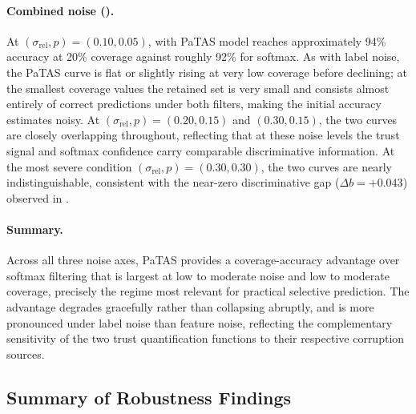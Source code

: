 \paragraph{Combined noise ().}
 At $(\sigma_{\text{rel}}, p) = (0.10, 0.05)$, with \ac{PaTAS} model reaches approximately 94\% accuracy at 20\% coverage against roughly 92\% for softmax. As with label noise, the \ac{PaTAS} curve is flat or slightly rising at very low coverage before declining; at the smallest coverage values the retained set is very small and consists almost entirely of correct predictions under both filters, making the initial accuracy estimates noisy. At $(\sigma_{\text{rel}}, p) = (0.20, 0.15)$ and $(0.30, 0.15)$, the two curves are closely overlapping throughout, reflecting that at these noise levels the trust signal and softmax confidence carry comparable discriminative information. At the most severe condition $(\sigma_{\text{rel}}, p) = (0.30, 0.30)$, the two curves are nearly indistinguishable, consistent with the near-zero discriminative gap ($\Delta b = +0.043$) observed in .

\paragraph{Summary.}
Across all three noise axes, \ac{PaTAS} provides a coverage-accuracy advantage over softmax filtering that is largest at low to moderate noise and low to moderate coverage, precisely the regime most relevant for practical selective prediction. The advantage degrades gracefully rather than collapsing abruptly, and is more pronounced under label noise than feature noise, reflecting the complementary sensitivity of the two trust quantification functions to their respective corruption sources.

\subsection{Summary of Robustness Findings}
\label{sec:robustness_summary}

